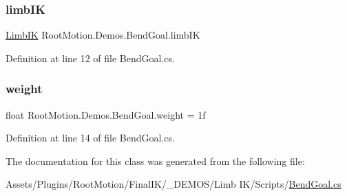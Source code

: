 \subsubsection{\texorpdfstring{limb\+IK}{limbIK}}
{\footnotesize\ttfamily \mbox{\hyperlink{class_root_motion_1_1_final_i_k_1_1_limb_i_k}{Limb\+IK}} Root\+Motion.\+Demos.\+Bend\+Goal.\+limb\+IK}



Definition at line 12 of file Bend\+Goal.\+cs.

\mbox{\label{class_root_motion_1_1_demos_1_1_bend_goal_a4c927a3968fdee885bfb52d09d859c1a}} 
\subsubsection{\texorpdfstring{weight}{weight}}
{\footnotesize\ttfamily float Root\+Motion.\+Demos.\+Bend\+Goal.\+weight = 1f}



Definition at line 14 of file Bend\+Goal.\+cs.



The documentation for this class was generated from the following file\+:\begin{DoxyCompactItemize}
\item 
Assets/\+Plugins/\+Root\+Motion/\+Final\+I\+K/\+\_\+\+D\+E\+M\+O\+S/\+Limb I\+K/\+Scripts/\mbox{\hyperlink{_bend_goal_8cs}{Bend\+Goal.\+cs}}\end{DoxyCompactItemize}
